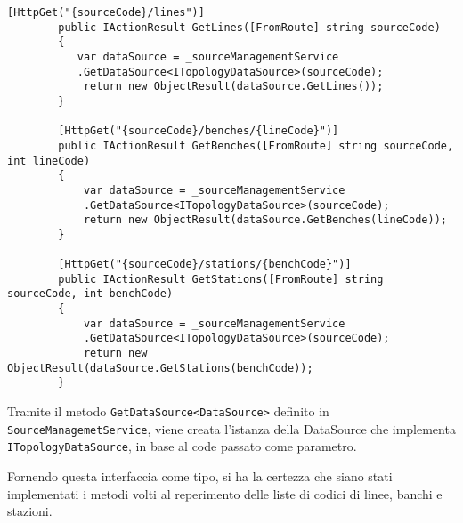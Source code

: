\begin{lstlisting}[caption={TopologyController.cs}, style=javaScriptCode]
        [HttpGet("{sourceCode}/lines")]
        public IActionResult GetLines([FromRoute] string sourceCode)
        {
           var dataSource = _sourceManagementService
           .GetDataSource<ITopologyDataSource>(sourceCode);
            return new ObjectResult(dataSource.GetLines());
        }

        [HttpGet("{sourceCode}/benches/{lineCode}")]
        public IActionResult GetBenches([FromRoute] string sourceCode, int lineCode)
        {
            var dataSource = _sourceManagementService
            .GetDataSource<ITopologyDataSource>(sourceCode);
            return new ObjectResult(dataSource.GetBenches(lineCode));
        }

        [HttpGet("{sourceCode}/stations/{benchCode}")]
        public IActionResult GetStations([FromRoute] string sourceCode, int benchCode)
        {
            var dataSource = _sourceManagementService
            .GetDataSource<ITopologyDataSource>(sourceCode);
            return new ObjectResult(dataSource.GetStations(benchCode));
        }
\end{lstlisting}
Tramite il metodo \verb|GetDataSource<DataSource>| definito in \verb|SourceManagemetService|, viene creata l'istanza della DataSource che implementa \verb|ITopologyDataSource|, in base al code passato come parametro.

Fornendo questa interfaccia come tipo, si ha la certezza che siano stati implementati i metodi volti al reperimento delle liste di codici di linee, banchi e stazioni.